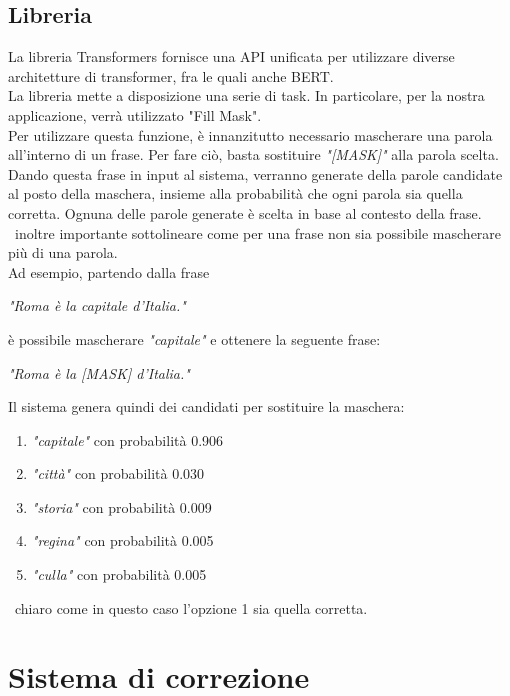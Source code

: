 \documentclass[12pt]{article}
\begin{document}
\subsection{Libreria}
La libreria Transformers\cite{transformers} fornisce una API unificata per utilizzare diverse architetture di transformer, fra le quali anche BERT.	\\
La libreria mette a disposizione una serie di task. In particolare, per la nostra applicazione, verrà utilizzato "Fill Mask".\\
\label{sec:fillmask}
Per utilizzare questa funzione, è innanzitutto necessario mascherare una parola all'interno di un frase. Per fare ciò, basta sostituire \textit{"[MASK]"} alla parola scelta. Dando questa frase in input al sistema, verranno generate della parole candidate al posto della maschera, insieme alla probabilità che ogni parola sia quella corretta. Ognuna delle parole generate è scelta in base al contesto della frase.\\
\E\ inoltre importante sottolineare come per una frase non sia possibile mascherare più di una parola.\\
Ad esempio, partendo dalla frase
\begin{center}
\textit{"Roma è la capitale d'Italia."}
\end{center}
è possibile mascherare \textit{"capitale"} e ottenere la seguente frase:
\begin{center}
\textit{"Roma è la [MASK] d'Italia."}
\end{center}
Il sistema genera quindi dei candidati per sostituire la maschera:
\begin{enumerate}
\item \textit{"capitale"} con probabilità 0.906
\item \textit{"città"} con probabilità 0.030
\item \textit{"storia"} con probabilità 0.009
\item \textit{"regina"} con probabilità 0.005
\item \textit{"culla"} con probabilità 0.005
\end{enumerate}
\E\ chiaro come in questo caso l'opzione 1 sia quella corretta.

\section{Sistema di correzione}
\end{document}
